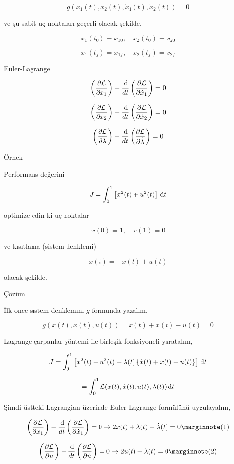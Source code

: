 \documentclass[12pt,fleqn]{article}\usepackage{../../common}
\begin{document}
$$
g(x_1(t), x_2(t), \dot{x}_1(t), \dot{x}_2(t)) = 0
$$

ve şu sabit uç noktaları geçerli olacak şekilde, 

$$
x_1(t_0) = x_{10}, \quad x_2(t_0) = x_{20}
$$

$$
x_1(t_f) = x_{1f}, \quad x_2(t_f) = x_{2f}
$$

Euler-Lagrange

$$
\left( \frac{\partial \mathcal{L}}{\partial x_1} \right) -
\frac{\,\mathrm{d}}{dt} \left( \frac{\partial \mathcal{L}}{\partial \dot{x}_1} \right) 
= 0
$$

$$
\left( \frac{\partial \mathcal{L}}{\partial x_2} \right) -
\frac{\,\mathrm{d}}{dt} \left( \frac{\partial \mathcal{L}}{\partial \dot{x}_2} \right) 
= 0
$$

$$
\left( \frac{\partial \mathcal{L}}{\partial \lambda} \right) -
\frac{\,\mathrm{d}}{dt} \left( \frac{\partial \mathcal{L}}{\partial \dot{\lambda}} \right) 
= 0
$$

Örnek

Performans değerini

$$
J = \int_{0}^{1} \left[ x^2(t) + u^2(t) \right] \,\mathrm{d} t
$$

optimize edin ki uç noktalar

$$
x(0) = 1, \quad x(1) = 0
$$

ve kısıtlama (sistem denklemi)

$$
\dot{x}(t) = -x(t) + u(t)
$$

olacak şekilde.

Çözüm

İlk önce sistem denklemini $g$ formunda yazalım,

$$
g( x(t), \dot{x}(t), u(t) ) =  \dot{x}(t) + x(t) - u(t)  = 0
$$

Lagrange çarpanlar yöntemi ile birleşik fonksiyoneli yaratalım,

$$
J = \int_{0}^{1} \left[ 
  x^2(t) + u^2(t) + \lambda(t) \left\{ \dot{x}(t) + x(t) - u(t)  \right\}
\right] \,\mathrm{d} t
$$

$$
=  \int_{0}^{1} \mathcal{L} (x(t), \dot{x}(t),u(t),\lambda(t)) \,\mathrm{d} t
$$

Şimdi üstteki Lagrangian üzerinde Euler-Lagrange formülünü uygulayalım, 

$$
\left( \frac{\partial \mathcal{L}}{\partial x_1} \right) -
\frac{\ud}{dt} \left( \frac{\partial \mathcal{L}}{\partial \dot{x}_1} \right) =
0 \to 2 x(t) + \lambda(t) - \dot{\lambda}(t) = 0
\mlabel{1}
$$

$$
\left( \frac{\partial \mathcal{L}}{\partial u} \right) -
\frac{\ud}{dt} \left( \frac{\partial \mathcal{L}}{\partial \dot{u}} \right) =
0 \to 2u(t) - \lambda(t) = 0
\mlabel{2}
$$
\end{document}
